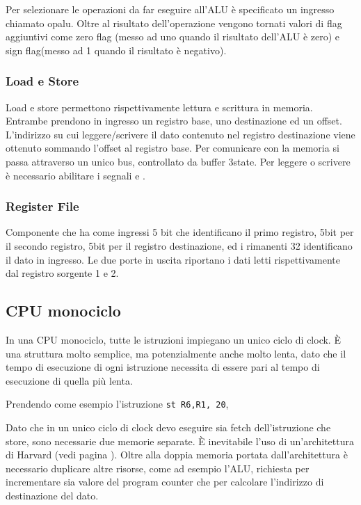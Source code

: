\documentclass[../ace.tex]{subfiles}
\begin{document}
Per selezionare le operazioni da far eseguire all'ALU è specificato un ingresso chiamato opalu.
Oltre al risultato  dell'operazione vengono tornati valori di flag aggiuntivi come zero flag (messo ad uno quando il risultato dell'ALU è zero) e sign flag(messo ad 1 quando il risultato è negativo).

\subsubsection{Load e Store}
Load e store permettono rispettivamente lettura e scrittura in memoria.
Entrambe prendono in ingresso un registro base, uno destinazione ed un offset.
L'indirizzo su cui leggere/scrivere il dato contenuto nel registro destinazione viene ottenuto sommando l'offset al registro base.
Per comunicare con la memoria si passa attraverso un unico bus, controllato da buffer 3state. Per leggere o scrivere è necessario abilitare i segnali
 e .

\subsubsection{Register File}
Componente che ha come ingressi 5 bit che identificano il primo registro, 5bit per il secondo registro,
5bit per il registro destinazione, ed i rimanenti 32 identificano il dato in ingresso.
Le due porte in uscita riportano i dati letti rispettivamente dal registro sorgente 1 e 2.

\def\tmono{T_\text{mono}}
\def\tmulti{T_\text{multi}}
\subsection{CPU monociclo}
In una CPU monociclo, tutte le istruzioni impiegano un unico ciclo di clock. È una struttura molto semplice, ma potenzialmente anche molto
lenta, dato che il tempo di esecuzione di ogni istruzione necessita di essere pari al tempo di esecuzione di quella più lenta.

Prendendo come esempio l'istruzione \lstinline{st R6,R1, 20},

Dato che in un unico ciclo di clock devo eseguire sia fetch dell'istruzione che store, sono necessarie due memorie separate.
È inevitabile l'uso di un'architettura di Harvard (vedi pagina \pageref{sec:architettura_harvard}).
Oltre alla doppia memoria portata dall'architettura è necessario duplicare altre risorse, come ad esempio l'ALU, richiesta
per incrementare sia valore del program counter che per calcolare l'indirizzo di destinazione del dato.
\end{document}

